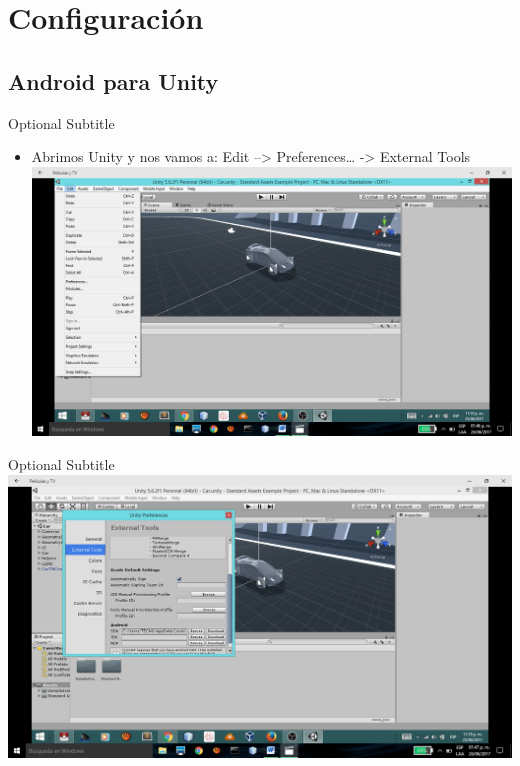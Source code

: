 \documentclass{beamer}
\begin{document}
\section{Configuración}

\subsection{Android para Unity}

\begin{frame}{26}{Optional Subtitle}
  \begin{itemize}
  \item {
   Abrimos Unity y nos vamos a:
Edit –> Preferences… -> External Tools
  }
  \includegraphics[width=\linewidth]{image/IU26}
  \end{itemize}
\end{frame}

\begin{frame}{27}{Optional Subtitle}
    \includegraphics[width=\linewidth]{image/IU27}
\end{frame}
\end{document}
